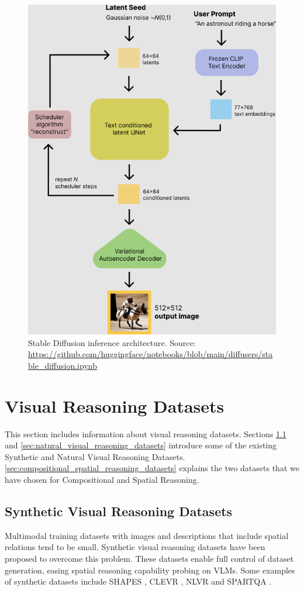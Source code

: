 \begin{figure}[ht]
    \centering
    \includegraphics[width=0.6\linewidth]{images/diffusion/stable_diffusion.png}
    \caption{Stable Diffusion inference architecture. Source: \url{https://github.com/huggingface/notebooks/blob/main/diffusers/stable_diffusion.ipynb}}
    \label{fig:stable_diffusion}
\end{figure}

\section{Visual Reasoning Datasets} \label{sec:visual_reasoning_datasets}

This section includes information about visual reasoning datasets. Sections \ref{sec:synthetic_visual_reasoning_datasets} and \ref{sec:natural_visual_reasoning_datasets} introduce some of the existing Synthetic and Natural Visual Reasoning Datasets. \cref{sec:compositional_spatial_reasoning_datasets} explains the two datasets that we have chosen for Compositional and Spatial Reasoning.

\subsection{Synthetic Visual Reasoning Datasets} \label{sec:synthetic_visual_reasoning_datasets}

Multimodal training datasets with images and descriptions that include spatial relations tend to be small. Synthetic visual reasoning datasets have been proposed to overcome this problem. These datasets enable full control of dataset generation, easing spatial reasoning capability probing  on VLMs. Some examples of synthetic datasets include SHAPES \cite{andreas2016neural}, CLEVR \cite{johnson2017clevr}, NLVR \cite{suhr-etal-2017-corpus} and SPARTQA \cite{mirzaee-etal-2021-spartqa}.

